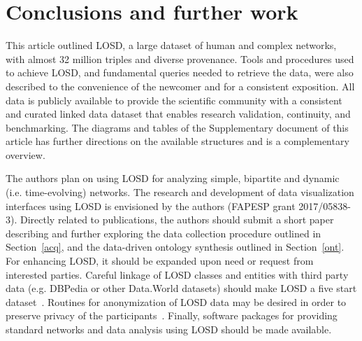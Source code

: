 \documentclass[data,datadescriptor,submit,moreauthors,pdftex]{Definitions/mdpi}
\begin{document}
\section{Conclusions and further work}
\label{conclusions}
This article outlined LOSD, a large dataset of human and complex networks, with almost 32 million triples and diverse provenance.
Tools and procedures used to achieve LOSD, and fundamental queries needed to retrieve the data, were also described to the convenience of the newcomer
and for a consistent exposition.
All data is publicly available to provide the scientific community with a consistent and curated linked data dataset
that enables research validation, continuity, and benchmarking.
The diagrams and tables of the Supplementary document of this article
has further directions on the available structures and is a complementary overview.

The authors plan on using LOSD for analyzing simple, bipartite
and dynamic (i.e. time-evolving) networks.
The research and development of data visualization interfaces using LOSD
is envisioned by the authors (FAPESP grant 2017/05838-3).
Directly related to publications, the authors should submit a short paper
describing and further exploring the data collection procedure outlined in Section~\ref{acq},
and the data-driven ontology synthesis outlined in Section~\ref{ont}.
For enhancing LOSD, it should be expanded upon need or request from interested parties.
Careful linkage of LOSD classes and entities with third party data (e.g. DBPedia or other Data.World datasets) should make LOSD a five start dataset~\cite{5star}.
Routines for anonymization of LOSD data may be desired in order to preserve privacy of the participants~\cite{ieee}.
Finally, software packages for providing standard networks and data analysis using LOSD should be made available.




\end{document}
